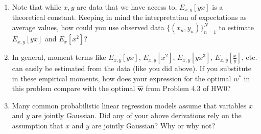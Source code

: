 \documentclass[submit]{../harvardml}
\begin{document}
\begin{problem}
\begin{enumerate}
  \item Note that while $x, y$ are data that we have access to, $E_{x, y}[yx]$ is a theoretical constant. Keeping in mind the interpretation of expectations as average values, how could you use observed data $\{(x_n,y_n)\}_{n=1}^N$ to estimate $E_{x, y}[yx]$ and $E_x[x^2]$?

  \item In general, moment terms like $E_{x, y}[yx]$, $E_{x, y}[x^2]$,
        $E_{x, y}[yx^3]$, $E_{x, y}[\frac{x}{y}]$, etc. can easily be
        estimated from the data (like you did above).  If you substitute in
        these empirical moments, how does your expression for the optimal
        $w^*$ in this problem compare with the optimal $\bm{\hat w}$ from Problem 4.3 of HW0?

  \item Many common probabilistic linear regression models assume that
        variables $x$ and $y$ are jointly Gaussian.  Did any of your above
        derivations rely on the assumption that $x$ and $y$ are jointly
        Gaussian?  Why or why not?
\end{enumerate}
\end{problem}
\end{document}
